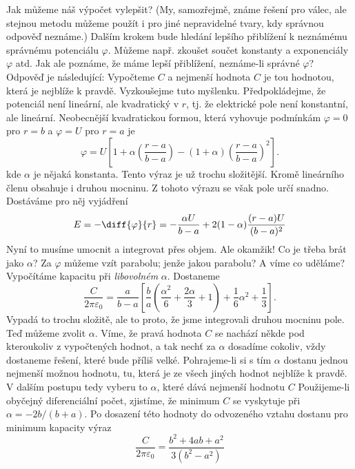     Jak můžeme náš výpočet vylepšit? (My, samozřejmě, známe řešení pro válec, ale stejnou metodu
    můžeme použít i pro jiné nepravidelné tvary, kdy správnou odpověď neznáme.) Dalším krokem bude
    hledání lepšího přiblížení k neznámému správnému potenciálu \(\varphi\). Můžeme např. zkoušet
    součet konstanty a exponenciály \(\varphi\) atd. Jak ale poznáme, že máme lepší přiblížení,
    neznáme-li správné \(\varphi\)? Odpověď je následující: Vypočteme \(C\) a nejmenší hodnota \(C\)
    je tou hodnotou, která je nejblíže k pravdě. Vyzkoušejme tuto myšlenku. Předpokládejme, že
    potenciál není lineární, ale kvadratický v \(r\), tj. že elektrické pole není konstantní, ale
    lineární. Neobecnější kvadratickou formou, která vyhovuje podmínkám \(\varphi = 0\) pro \(r=b\)
    a \(\varphi=U\) pro \(r=a\) je
    \begin{equation*}
      \varphi = U\left[1 + \alpha \left(\dfrac{r-a}{b-a}\right) 
                    - (1 + \alpha)\left(\dfrac{r-a}{b-a}\right)^2\right].
    \end{equation*}
    kde \(\alpha\) je nějaká konstanta. Tento výraz je už trochu složitější. Kromě lineárního členu
    obsahuje i druhou mocninu. Z tohoto výrazu se však pole určí snadno. Dostáváme pro něj vyjádření
    \begin{equation*}
      E = -\diff{\varphi}{r} = - \dfrac{\alpha U}{b-a} + 2(1 - \alpha)\dfrac{(r-a)U}{(b-a)^2}
    \end{equation*}
    Nyní to musíme umocnit a integrovat přes objem. Ale okamžik! Co je třeba brát jako \(\alpha\)?
    Za \(\varphi\) můžeme vzít parabolu; jenže jakou parabolu? A víme co uděláme? Vypočítáme
    kapacitu při \emph{libovolném} \(\alpha\). Dostaneme
    \begin{equation*}
      \dfrac{C}{2\pi\varepsilon_0} = 
      \dfrac{a}{b-a}\left[
          \dfrac{b}{a}\left(\dfrac{\alpha^2}{6}+\dfrac{2\alpha}{3}+1\right) + 
          \dfrac{1}{6}\alpha^2+\dfrac{1}{3}
      \right].
    \end{equation*}
    Vypadá to trochu složitě, ale to proto, že jsme integrovali druhou mocninu pole. Teď můžeme
    zvolit \(\alpha\). Víme, že pravá hodnota \(C\) se nachází někde pod kteroukoliv z vypočtených
    hodnot, a tak nechť za \(\alpha\) dosadíme cokoliv, vždy dostaneme řešení, které bude příliš
    velké. Pohrajeme-li si s tím \(\alpha\) dostanu jednou nejmenší možnou hodnotu, tu, která je ze
    všech jiných hodnot nejblíže k pravdě. V dalším postupu tedy vyberu to \(\alpha\), které dává
    nejmenší hodnotu \(C\) Použijeme-li obyčejný diferenciální počet, zjistíme, že minimum \(C\) se
    vyskytuje při \(\alpha = - 2 b/(b + a)\). Po dosazení této hodnoty do odvozeného vztahu dostanu
    pro minimum kapacity výraz
    \begin{equation*}
      \dfrac{C}{2\pi\varepsilon_0} = \dfrac{b^2 + 4ab + a^2}{3(b^2 - a^2)}
    \end{equation*}

